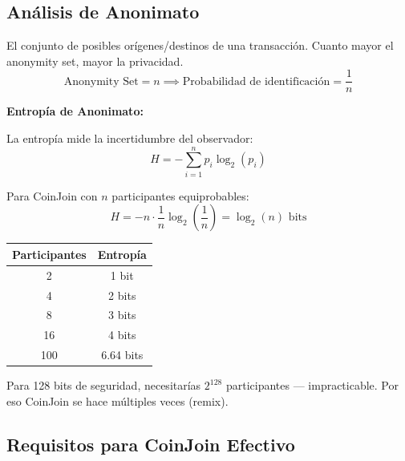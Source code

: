 \documentclass[11pt,a4paper,twoside]{book}
\begin{document}
\subsection{An\'alisis de Anonimato}

\begin{definition}
El conjunto de posibles or\'igenes/destinos de una transacci\'on. Cuanto mayor el anonymity set, mayor la privacidad.
\[
\text{Anonymity Set} = n \implies \text{Probabilidad de identificaci\'on} = \frac{1}{n}
\]
\end{definition}

\begin{mathnote}
\textbf{Entrop\'ia de Anonimato:}

La entrop\'ia mide la incertidumbre del observador:
\[
H = -\sum_{i=1}^{n} p_i \log_2(p_i)
\]

Para CoinJoin con $n$ participantes equiprobables:
\[
H = -n \cdot \frac{1}{n} \log_2\left(\frac{1}{n}\right) = \log_2(n) \text{ bits}
\]

\begin{center}
\begin{tabular}{cc}
\toprule
Participantes & Entrop\'ia \\
\midrule
2 & 1 bit \\
4 & 2 bits \\
8 & 3 bits \\
16 & 4 bits \\
100 & 6.64 bits \\
\bottomrule
\end{tabular}
\end{center}

Para 128 bits de seguridad, necesitar\'ias $2^{128}$ participantes --- impracticable. Por eso CoinJoin se hace m\'ultiples veces (remix).
\end{mathnote}

\subsection{Requisitos para CoinJoin Efectivo}
\end{document}
